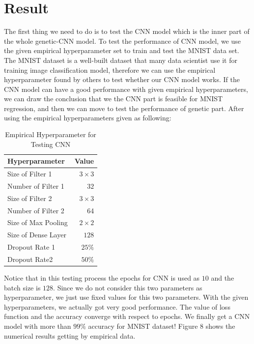 \documentclass[12pt]{article}
\begin{document}
\section{Result}
The first thing we need to do is to test the CNN model which is the inner part of the whole genetic-CNN model. To test the performance of CNN model, we use the given empirical hyperparameter set to train and test the MNIST data set. The MNIST dataset is a well-built dataset that many data scientist use it for training image classification model, therefore we can use the empirical hyperparameter found by others to test whether our CNN model works. If the CNN model can have a good performance with given empirical hyperparameters, we can draw the conclusion that we the CNN part is feasible for MNIST regression, and then we can move to test the performance of genetic part. After using the empirical hyperparameters given as following:\\
\begin{table}
\caption{Empirical Hyperparameter for Testing CNN}
\centering
\begin{tabular}{l r}
\hline\hline 
Hyperparameter & Value \\ [0.5ex]
\hline
Size of Filter 1 & $3 \times 3$ \\
Number of Filter 1 & $32 $\\
Size of Filter 2 & $3 \times 3$ \\
Number of Filter 2 & 64 \\
Size of Max Pooling & $2 \times 2$ \\
Size of Dense Layer & $128$ \\
Dropout Rate 1 & $25\%$ \\
Dropout Rate2 & $50\%$ \\
\hline
\end{tabular}
\label{table:empirical}
\end{table}
Notice that in this testing process the epochs for CNN is used as $10$ and the batch size is $128$. Since we do not consider this two parameters as hyperparameter, we just use fixed values for this two parameters. With the given hyperparameters, we actually got very good performance. The value of loss function and the accuracy converge with respect to epochs. We finally get a CNN model with more than $99\%$ accuracy for MNIST dataset! Figure 8 shows the numerical results getting by empirical data.\\
\end{document}
